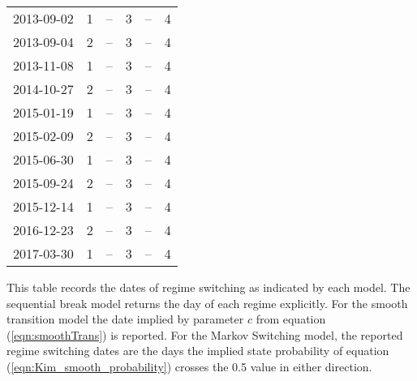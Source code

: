 \documentclass[12pt]{article}
\begin{document}
\begin{table}
\begin{tabular}[c]{r r | r r | r r}
		2013-09-02 &  1 &         -- &  3 &         -- &  4 \\
		2013-09-04 &  2 &         -- &  3 &         -- &  4 \\
		2013-11-08 &  1 &         -- &  3 &         -- &  4 \\
		2014-10-27 &  2 &         -- &  3 &         -- &  4 \\
		2015-01-19 &  1 &         -- &  3 &         -- &  4 \\
		2015-02-09 &  2 &         -- &  3 &         -- &  4 \\
		2015-06-30 &  1 &         -- &  3 &         -- &  4 \\
		2015-09-24 &  2 &         -- &  3 &         -- &  4 \\
		2015-12-14 &  1 &         -- &  3 &         -- &  4 \\
		2016-12-23 &  2 &         -- &  3 &         -- &  4 \\
		2017-03-30 &  1 &         -- &  3 &         -- &  4 \\
		\hline
	\end{tabular}
	\begin{tablenotes}
		\item{\footnotesize This table records the dates of regime switching as indicated by each model. The sequential break model returns the day of each regime explicitly. For the smooth transition model the date implied by parameter $c$ from equation (\ref{eqn:smoothTrans}) is reported. For the Markov Switching model, the reported regime switching dates are the days the implied state probability of equation (\ref{eqn:Kim_smooth_probability}) crosses the 0.5 value in either direction.}
	\end{tablenotes}
	\label{tbl:regime_changes_pound_yen}
\end{table}

\printbibliography
\end{document}
